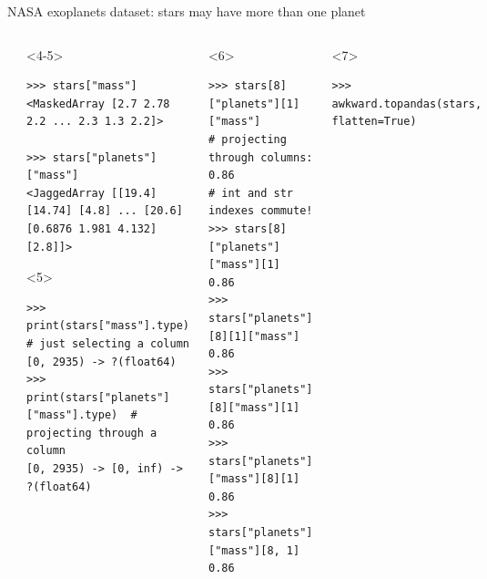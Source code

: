\documentclass[aspectratio=169]{beamer}
\begin{document}
\begin{frame}[fragile]{NASA exoplanets dataset: stars may have more than one planet}
\begin{columns}
\begin{onlyenv}
\vspace{10 cm}
\end{onlyenv}
\begin{onlyenv}<4-5>
\begin{verbatim}
>>> stars["mass"]
<MaskedArray [2.7 2.78 2.2 ... 2.3 1.3 2.2]>

>>> stars["planets"]["mass"]
<JaggedArray [[19.4] [14.74] [4.8] ... [20.6] [0.6876 1.981 4.132] [2.8]]>
\end{verbatim}

\begin{uncoverenv}<5>
\begin{verbatim}
>>> print(stars["mass"].type)             # just selecting a column
[0, 2935) -> ?(float64)
>>> print(stars["planets"]["mass"].type)  # projecting through a column
[0, 2935) -> [0, inf) -> ?(float64)
\end{verbatim}
\end{uncoverenv}

\vspace{10 cm}
\end{onlyenv}
\begin{onlyenv}<6>
\begin{verbatim}
>>> stars[8]["planets"][1]["mass"]        # projecting through columns:
0.86                                      # int and str indexes commute!
>>> stars[8]["planets"]["mass"][1]
0.86
>>> stars["planets"][8][1]["mass"]
0.86
>>> stars["planets"][8]["mass"][1]
0.86
>>> stars["planets"]["mass"][8][1]
0.86
>>> stars["planets"]["mass"][8, 1]
0.86
\end{verbatim}

\vspace{10 cm}
\end{onlyenv}
\begin{onlyenv}<7>
\vspace{-0.4 cm}
\begin{verbatim}
>>> awkward.topandas(stars, flatten=True)
\end{verbatim}


\end{onlyenv}
\end{columns}
\end{frame}
\end{document}
